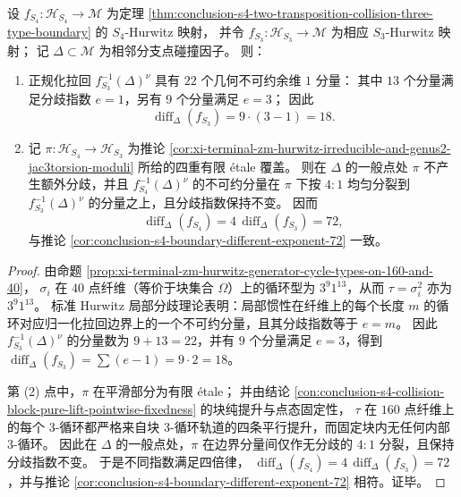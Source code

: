 \begin{conclusion}\label{con:conclusion-s3-collision-different-exponent-fourfold-law}
设 \(f_{S_4}:\mathcal H_{S_4}\to \mathcal M\) 为定理 \ref{thm:conclusion-s4-two-transposition-collision-three-type-boundary} 的 \(S_4\)-Hurwitz 映射，
并令 \(f_{S_3}:\mathcal H_{S_3}\to \mathcal M\) 为相应 \(S_3\)-Hurwitz 映射；
记 \(\Delta\subset\mathcal M\) 为相邻分支点碰撞因子。
则：
\begin{enumerate}
  \item 正规化拉回 \(f_{S_3}^{-1}(\Delta)^\nu\) 具有 \(22\) 个几何不可约余维 \(1\) 分量：
  其中 \(13\) 个分量满足分歧指数 \(e=1\)，另有 \(9\) 个分量满足 \(e=3\)；
  因此
  \[
  \operatorname{diff}_{\Delta}(f_{S_3})=9\cdot(3-1)=18.
  \]
  \item 记 \(\pi:\mathcal H_{S_4}\to \mathcal H_{S_3}\) 为推论 \ref{cor:xi-terminal-zm-hurwitz-irreducible-and-genus2-jac3torsion-moduli} 所给的四重有限 \'etale 覆盖。
  则在 \(\Delta\) 的一般点处 \(\pi\) 不产生额外分歧，并且
  \(f_{S_4}^{-1}(\Delta)^\nu\) 的不可约分量在 \(\pi\) 下按 \(4{:}1\) 均匀分裂到
  \(f_{S_3}^{-1}(\Delta)^\nu\) 的分量之上，且分歧指数保持不变。
  因而
  \[
  \operatorname{diff}_{\Delta}(f_{S_4})=4\,\operatorname{diff}_{\Delta}(f_{S_3})=72,
  \]
  与推论 \ref{cor:conclusion-s4-boundary-different-exponent-72} 一致。
\end{enumerate}
\end{conclusion}
\begin{proof}
由命题 \ref{prop:xi-terminal-zm-hurwitz-generator-cycle-types-on-160-and-40}，
\(\sigma_i\) 在 \(40\) 点纤维（等价于块集合 \(\Omega\)）上的循环型为 \(3^{9}1^{13}\)，从而 \(\tau=\sigma_i^2\) 亦为 \(3^{9}1^{13}\)。
标准 Hurwitz 局部分歧理论表明：局部惯性在纤维上的每个长度 \(m\) 的循环对应归一化拉回边界上的一个不可约分量，且其分歧指数等于 \(e=m\)。
因此 \(f_{S_3}^{-1}(\Delta)^\nu\) 的分量数为 \(9+13=22\)，并有 \(9\) 个分量满足 \(e=3\)，得到
\(\operatorname{diff}_{\Delta}(f_{S_3})=\sum(e-1)=9\cdot 2=18\)。
\par
第 (2) 点中，\(\pi\) 在平滑部分为有限 \'etale；
并由结论 \ref{con:conclusion-s4-collision-block-pure-lift-pointwise-fixedness} 的块纯提升与点态固定性，
\(\tau\) 在 \(160\) 点纤维上的每个 \(3\)-循环都严格来自块 \(3\)-循环轨道的四条平行提升，而固定块内无任何内部 \(3\)-循环。
因此在 \(\Delta\) 的一般点处，\(\pi\) 在边界分量间仅作无分歧的 \(4{:}1\) 分裂，且保持分歧指数不变。
于是不同指数满足四倍律，
\(\operatorname{diff}_{\Delta}(f_{S_4})=4\,\operatorname{diff}_{\Delta}(f_{S_3})=72\)，并与推论 \ref{cor:conclusion-s4-boundary-different-exponent-72} 相符。证毕。
\end{proof}

